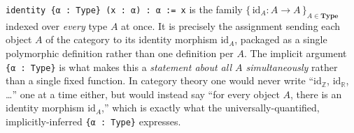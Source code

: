\begin{mathreading}

\texttt{identity \{α : Type\} (x : α) : α := x} is the family \(\{\,\mathrm{id}_A : A \to A\,\}_{A \in \mathbf{Type}}\) indexed over \emph{every} type \(A\) at once. It is precisely the assignment sending each object \(A\) of the category to its identity morphism \(\mathrm{id}_A\), packaged as a single polymorphic definition rather than one definition per \(A\). The implicit argument \texttt{\{α : Type\}} is what makes this a \emph{statement about all \(A\) simultaneously} rather than a single fixed function. In category theory one would never write ``\(\mathrm{id}_{\mathbb{Z}}\), \(\mathrm{id}_{\mathbb{R}}\), \ldots{}'' one at a time either, but would instead say ``for every object \(A\), there is an identity morphism \(\mathrm{id}_A\),'' which is exactly what the universally-quantified, implicitly-inferred \texttt{\{α : Type\}} expresses.

\end{mathreading}
